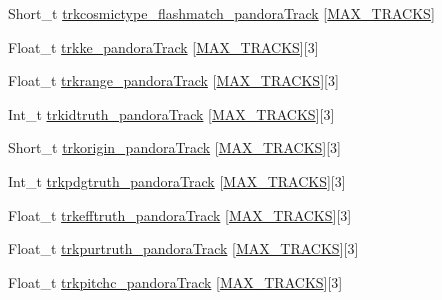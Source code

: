\begin{DoxyCompactItemize}
\item 
Short\-\_\-t \hyperlink{classanatree_ab4993ea316d2ef41425aa7dc1a4681eb}{trkcosmictype\-\_\-flashmatch\-\_\-pandora\-Track} \mbox{[}\hyperlink{anatree__core__v09410002__orig_8h_a327fd4e796e4a0d78947524c96e4362e}{M\-A\-X\-\_\-\-T\-R\-A\-C\-K\-S}\mbox{]}
\item 
Float\-\_\-t \hyperlink{classanatree_a2049a2b808b9af477b1d2381dad688cd}{trkke\-\_\-pandora\-Track} \mbox{[}\hyperlink{anatree__core__v09410002__orig_8h_a327fd4e796e4a0d78947524c96e4362e}{M\-A\-X\-\_\-\-T\-R\-A\-C\-K\-S}\mbox{]}\mbox{[}3\mbox{]}
\item 
Float\-\_\-t \hyperlink{classanatree_a4d776d6480b303e29f417bf03bcb8dc6}{trkrange\-\_\-pandora\-Track} \mbox{[}\hyperlink{anatree__core__v09410002__orig_8h_a327fd4e796e4a0d78947524c96e4362e}{M\-A\-X\-\_\-\-T\-R\-A\-C\-K\-S}\mbox{]}\mbox{[}3\mbox{]}
\item 
Int\-\_\-t \hyperlink{classanatree_a40d2f52edb643ad82ba20c86e2c74528}{trkidtruth\-\_\-pandora\-Track} \mbox{[}\hyperlink{anatree__core__v09410002__orig_8h_a327fd4e796e4a0d78947524c96e4362e}{M\-A\-X\-\_\-\-T\-R\-A\-C\-K\-S}\mbox{]}\mbox{[}3\mbox{]}
\item 
Short\-\_\-t \hyperlink{classanatree_abaa417392908ce717ead8301fdf45296}{trkorigin\-\_\-pandora\-Track} \mbox{[}\hyperlink{anatree__core__v09410002__orig_8h_a327fd4e796e4a0d78947524c96e4362e}{M\-A\-X\-\_\-\-T\-R\-A\-C\-K\-S}\mbox{]}\mbox{[}3\mbox{]}
\item 
Int\-\_\-t \hyperlink{classanatree_a80a42e7502ea74fea97d63ea47b18f8c}{trkpdgtruth\-\_\-pandora\-Track} \mbox{[}\hyperlink{anatree__core__v09410002__orig_8h_a327fd4e796e4a0d78947524c96e4362e}{M\-A\-X\-\_\-\-T\-R\-A\-C\-K\-S}\mbox{]}\mbox{[}3\mbox{]}
\item 
Float\-\_\-t \hyperlink{classanatree_a4bd0c499d56e220df8aee0eca0b05b2c}{trkefftruth\-\_\-pandora\-Track} \mbox{[}\hyperlink{anatree__core__v09410002__orig_8h_a327fd4e796e4a0d78947524c96e4362e}{M\-A\-X\-\_\-\-T\-R\-A\-C\-K\-S}\mbox{]}\mbox{[}3\mbox{]}
\item 
Float\-\_\-t \hyperlink{classanatree_a755d1114f45ff20099c25bc737f50b74}{trkpurtruth\-\_\-pandora\-Track} \mbox{[}\hyperlink{anatree__core__v09410002__orig_8h_a327fd4e796e4a0d78947524c96e4362e}{M\-A\-X\-\_\-\-T\-R\-A\-C\-K\-S}\mbox{]}\mbox{[}3\mbox{]}
\item 
Float\-\_\-t \hyperlink{classanatree_a7acbb31c0dcf973553259ed30061b020}{trkpitchc\-\_\-pandora\-Track} \mbox{[}\hyperlink{anatree__core__v09410002__orig_8h_a327fd4e796e4a0d78947524c96e4362e}{M\-A\-X\-\_\-\-T\-R\-A\-C\-K\-S}\mbox{]}\mbox{[}3\mbox{]}

\end{DoxyCompactItemize}
